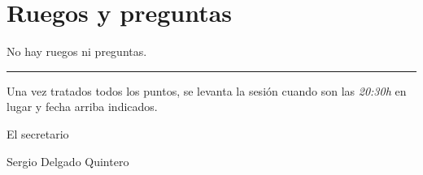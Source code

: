 \documentclass[a4paper, 12pt]{article}
\begin{document}
\section{Ruegos y preguntas}

No hay ruegos ni preguntas.


\vspace{1cm}
\hrule
\vspace{3mm}

Una vez tratados todos los puntos, se levanta la sesión cuando son las \textit{20:30h} en lugar y fecha arriba indicados.

\begin{flushright}
El secretario

Sergio Delgado Quintero
\end{flushright}
\end{document}
